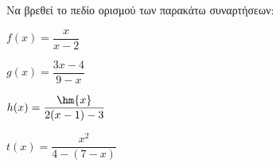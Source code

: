 Να βρεθεί το πεδίο ορισμού των παρακάτω συναρτήσεων:
\begin{alist}
\item $ f(x)=\dfrac{x}{x-2} $
\item $ g(x)=\dfrac{3x-4}{9-x} $
\item $ h(x)=\dfrac{\hm{x}}{2(x-1)-3} $
\item $ t(x)=\dfrac{x^2}{4-(7-x)} $
\end{alist}
